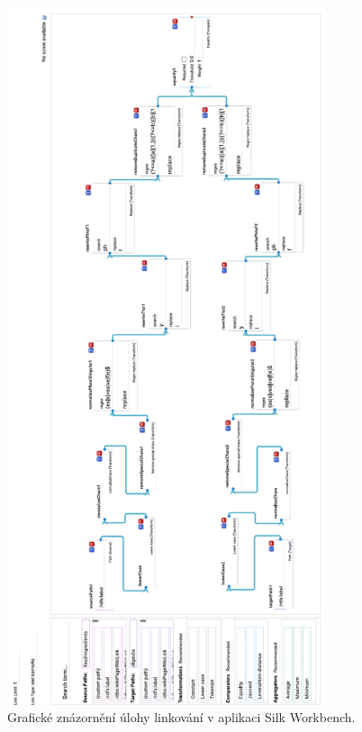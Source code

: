 \documentclass[12pt,a4paper]{report}
\let\openright=\clearpage
\begin{document}
\begin{figure}[h!]\centering
\includegraphics[height=205mm]{../img/silk-workbench}
\caption{Grafické znázornění úlohy linkování v aplikaci Silk Workbench.}
\label{obr0a:silk-workbench}
\end{figure}

\openright
\end{document}
